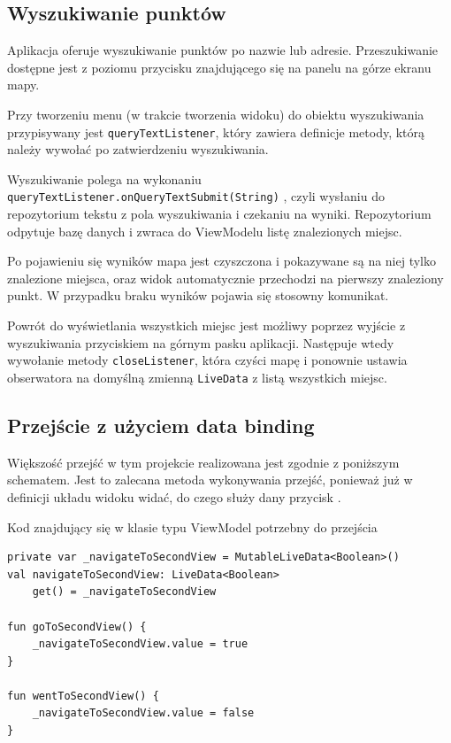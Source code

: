 \documentclass[polish,polish,a4paper,12pt]{article}
\begin{document}
	\subsection{Wyszukiwanie punktów}

	Aplikacja oferuje wyszukiwanie punktów po nazwie lub adresie. Przeszukiwanie dostępne jest z poziomu przycisku znajdującego się na panelu na górze ekranu mapy.

	Przy tworzeniu menu (w trakcie tworzenia widoku) do obiektu wyszukiwania przypisywany jest \texttt{queryTextListener}, który zawiera definicje metody, którą należy wywołać po zatwierdzeniu wyszukiwania.

	Wyszukiwanie polega na wykonaniu \texttt{queryTextListener.onQueryTextSubmit(String)} \cite{androidapi}, czyli wysłaniu do repozytorium tekstu z pola wyszukiwania i czekaniu na wyniki. Repozytorium odpytuje bazę danych i zwraca do ViewModelu listę znalezionych miejsc.

	Po pojawieniu się wyników mapa jest czyszczona i pokazywane są na niej tylko znalezione miejsca, oraz widok automatycznie przechodzi na pierwszy znaleziony punkt. W przypadku braku wyników pojawia się stosowny komunikat.

	Powrót do wyświetlania wszystkich miejsc jest możliwy poprzez wyjście z wyszukiwania przyciskiem na górnym pasku aplikacji. Następuje wtedy wywołanie metody \texttt{closeListener}, która czyści mapę i ponownie ustawia obserwatora na domyślną zmienną \texttt{LiveData} z listą wszystkich miejsc.

	\subsection{Przejście z użyciem data binding}\label{navigation}

	Większość przejść w tym projekcie realizowana jest zgodnie z poniższym schematem. Jest to zalecana metoda wykonywania przejść, ponieważ już w definicji układu widoku widać, do czego służy dany przycisk \cite{kotlin}.

	\begin{listing}[H]
		\caption{Kod znajdujący się w klasie typu ViewModel potrzebny do przejścia}
		\begin{verbatim}
private var _navigateToSecondView = MutableLiveData<Boolean>()
val navigateToSecondView: LiveData<Boolean>
	get() = _navigateToSecondView

fun goToSecondView() {
	_navigateToSecondView.value = true
}

fun wentToSecondView() {
	_navigateToSecondView.value = false
}
		\end{verbatim}
		\label{listing:navigationviewmodel}
	\end{listing}
\end{document}
